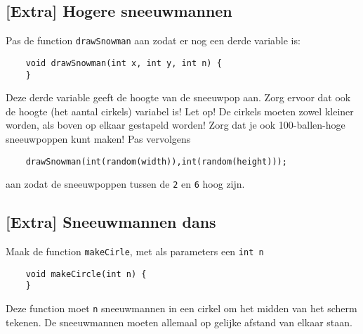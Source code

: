 \documentclass{../qh_exercise}
\begin{document}
\subsection{[Extra] Hogere sneeuwmannen}
Pas de function \texttt{drawSnowman} aan zodat er nog een derde variable is:
\begin{lstlisting}
    void drawSnowman(int x, int y, int n) {
    }
\end{lstlisting}
Deze derde variable geeft de hoogte van de sneeuwpop aan. Zorg ervoor dat ook de hoogte (het aantal cirkels) variabel is! Let op! De cirkels moeten zowel kleiner worden, als boven op elkaar gestapeld worden! Zorg dat je ook 100-ballen-hoge sneeuwpoppen kunt maken! Pas vervolgens 
\begin{lstlisting}
    drawSnowman(int(random(width)),int(random(height)));
\end{lstlisting}
aan zodat de sneeuwpoppen tussen de \texttt{2} en \texttt{6} hoog zijn.
\subsection{[Extra] Sneeuwmannen dans}
Maak de function \texttt{makeCirle}, met als parameters een \texttt{int n}
\begin{lstlisting}
    void makeCircle(int n) {
    }
\end{lstlisting}
Deze function moet \texttt{n} sneeuwmannen in een cirkel om het midden van het scherm tekenen. De sneeuwmannen moeten allemaal op gelijke afstand van elkaar staan.
\end{document}
